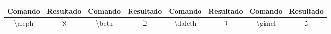 % 
% 
% 
% 
% 
\begin{tabular}{cc|cc|cc|cc}
    \hline
    Comando & Resultado & Comando & Resultado & Comando & Resultado & Comando & Resultado \\ \hline
    \textbackslash\textsf{aleph} & $\aleph$ & \textbackslash\textsf{beth} & $\beth$ & \textbackslash\textsf{daleth} & $\daleth$ & \textbackslash\textsf{gimel} & $\gimel$ \\ \hline
\end{tabular}
